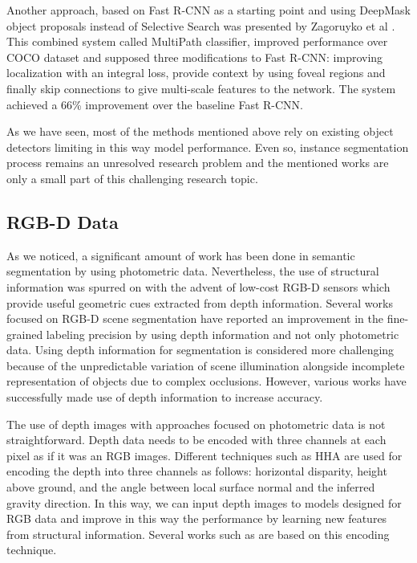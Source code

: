Another approach, based on Fast R-CNN as a starting point and using DeepMask object proposals instead of Selective Search was presented by Zagoruyko et al \cite{Zagoruyko2016}. This combined system called MultiPath classifier, improved performance over COCO dataset and supposed three modifications to Fast R-CNN: improving localization with an integral loss, provide context by using foveal regions and finally skip connections to give multi-scale features to the network. The system achieved a 66\% improvement over the baseline Fast R-CNN.

As we have seen, most of the methods mentioned above rely on existing object detectors limiting in this way model performance. Even so, instance segmentation process remains an unresolved research problem and the mentioned works are only a small part of this challenging research topic. 

\subsection{\acs{RGB-D} Data}

As we noticed, a significant amount of work has been done in semantic segmentation by using photometric data. Nevertheless, the use of structural information was spurred on with the advent of low-cost \acs{RGB-D} sensors which provide useful geometric cues extracted from depth information. Several works focused on \acs{RGB-D} scene segmentation have reported an improvement in the fine-grained labeling precision by using depth information and not only photometric data. Using depth information for segmentation is considered more challenging because of the unpredictable variation of scene illumination alongside incomplete representation of objects due to complex occlusions. However, various works have successfully made use of depth information to increase accuracy.

The use of depth images with approaches focused on photometric data is not straightforward. Depth data needs to be encoded with three channels at each pixel as if it was an \acs{RGB} images. Different techniques such as \ac{HHA} \cite{Gupta2014} are used for encoding the depth into three channels as follows: horizontal disparity, height above ground, and the angle between local surface normal and the inferred gravity direction. In this way, we can input depth images to models designed for \acs{RGB} data and improve in this way the performance by learning new features from structural information. Several works such as \cite{ZhenLi2016} are based on this encoding technique.

